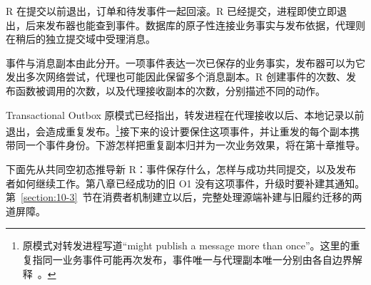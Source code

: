 R 在提交以前退出，订单和待发事件一起回滚。R 已经提交，进程即使立即退出，后来发布器也能查到事件。数据库的原子性连接业务事实与发布依据，代理则在稍后的独立提交域中受理消息。

事件与消息副本由此分开。一项事件表达一次已保存的业务事实，发布器可以为它发出多次网络尝试，代理也可能因此保留多个消息副本。R 创建事件的次数、发布函数被调用的次数，以及代理接收副本的次数，分别描述不同的动作。

Transactional Outbox 原模式已经指出，转发进程在代理接收以后、本地记录以前退出，会造成重复发布。\footnote{原模式对转发进程写道“might publish a message more than once”。这里的重复指同一业务事件可能再次发布，事件唯一与代理副本唯一分别由各自边界解释~\cite{outbox}。}接下来的设计要保住这项事件，并让重发的每个副本携带同一个事件身份。下游怎样把重复副本归并为一次业务效果，将在第十章推导。

下面先从共同空初态推导新 R：事件保存什么，怎样与成功共同提交，以及发布者如何继续工作。第八章已经成功的旧 O1 没有这项事件，升级时要补建其通知。第~\ref{section:10-3}~节在消费者机制建立以后，完整处理源端补建与旧履约迁移的两道屏障。

